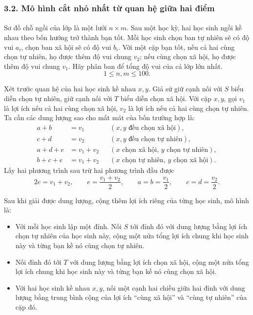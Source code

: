 \documentclass[11pt]{article}
\begin{document}
\subsubsection*{3.2. Mô hình cắt nhỏ nhất từ quan hệ giữa hai điểm}

\paragraph{}
Sơ đồ chỗ ngồi của lớp là một lưới \(n\times m\). Sau một học kỳ, hai học
sinh ngồi kề nhau theo bốn hướng trở thành bạn tốt. Mỗi học sinh chọn ban tự
nhiên sẽ có độ vui \(a_i\), chọn ban xã hội sẽ có độ vui \(b_i\). Với một cặp
bạn tốt, nếu cả hai cùng chọn tự nhiên, họ được thêm độ vui chung \(v_2\); nếu
cùng chọn xã hội, họ được thêm độ vui chung \(v_1\). Hãy phân ban để tổng độ
vui của cả lớp lớn nhất.
\[
  1\le n,m\le 100.
\]

Xét trước quan hệ của hai học sinh kề nhau \(x,y\). Giả sử giữ cạnh nối với
\(S\) biểu diễn chọn tự nhiên, giữ cạnh nối với \(T\) biểu diễn chọn xã hội.
Với cặp \(x,y\), gọi \(v_1\) là lợi ích nếu cả hai cùng chọn xã hội, \(v_2\)
là lợi ích nếu cả hai cùng chọn tự nhiên. Ta cần các dung lượng sao cho mất
mát của bốn trường hợp là:
\[
\begin{aligned}
  a+b &= v_1 &&(x,y\text{ đều chọn xã hội}),\\
  c+d &= v_2 &&(x,y\text{ đều chọn tự nhiên}),\\
  a+d+e &= v_1+v_2 &&(x\text{ chọn xã hội},\,y\text{ chọn tự nhiên}),\\
  b+c+e &= v_1+v_2 &&(x\text{ chọn tự nhiên},\,y\text{ chọn xã hội}).
\end{aligned}
\]
Lấy hai phương trình sau trừ hai phương trình đầu được
\[
  2e=v_1+v_2,\qquad
  e=\frac{v_1+v_2}{2},\qquad
  a=b=\frac{v_1}{2},\qquad c=d=\frac{v_2}{2}.
\]

Sau khi giải được dung lượng, cộng thêm lợi ích riêng của từng học sinh, mô
hình là:
\begin{itemize}
  \item Với mỗi học sinh lập một đỉnh. Nối \(S\) tới đỉnh đó với dung lượng
  bằng lợi ích chọn tự nhiên của học sinh này, cộng một nửa tổng lợi ích chung
  khi học sinh này và từng bạn kề nó cùng chọn tự nhiên.
  \item Nối đỉnh đó tới \(T\) với dung lượng bằng lợi ích chọn xã hội, cộng
  một nửa tổng lợi ích chung khi học sinh này và từng bạn kề nó cùng chọn xã
  hội.
  \item Với hai học sinh kề nhau \(x,y\), nối một cạnh hai chiều giữa hai đỉnh
  với dung lượng bằng trung bình cộng của lợi ích ``cùng xã hội'' và ``cùng
  tự nhiên'' của cặp đó.
\end{itemize}
\end{document}
